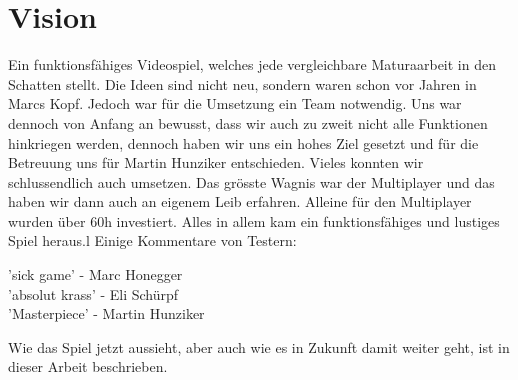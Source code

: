 \chapter{Vision}

Ein funktionsfähiges Videospiel, welches jede vergleichbare Maturaarbeit in den Schatten stellt.
Die Ideen sind nicht neu, sondern waren schon vor Jahren in Marcs Kopf.
Jedoch war für die Umsetzung ein Team notwendig.
Uns war dennoch von Anfang an bewusst,
dass wir auch zu zweit nicht alle Funktionen hinkriegen werden, dennoch haben wir uns ein hohes Ziel gesetzt und für die Betreuung uns für Martin Hunziker entschieden.
Vieles konnten wir schlussendlich auch umsetzen.
Das grösste Wagnis war der Multiplayer und das haben wir dann auch an eigenem Leib erfahren.
Alleine für den Multiplayer wurden über 60h investiert.
Alles in allem kam ein funktionsfähiges und lustiges Spiel heraus.l
Einige Kommentare von Testern:
\begin{center}
    'sick game' - Marc Honegger \\
    'absolut krass' - Eli Schürpf \\ 
    'Masterpiece' - Martin Hunziker
\end{center}
Wie das Spiel jetzt aussieht, aber auch wie es in Zukunft damit weiter geht, ist in dieser Arbeit beschrieben.
